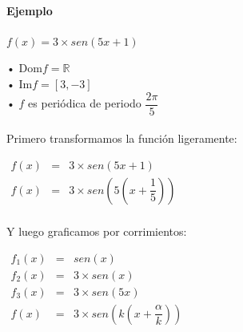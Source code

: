 \paragraph{Ejemplo}

\qquad $f(x)  = 3 \times sen(5x+1)$

\hfill
\begin{minipage}{.45\textwidth}
• Dom$f = \mathbb{R}$\\
• Im$f = [3, -3]$\\
• $f$ es periódica de periodo $\dfrac{2\pi}{5}$ \\
\\

Primero transformamos la función ligeramente:
\begin{center}
$\begin{array}{ccc}
f(x) & = & 3 \times sen(5x+1)\\
f(x) & = & 3 \times sen \left(5\left(x+\dfrac{1}{5}\right) \right)\\
\end{array}$\\
\end{center}

Y luego graficamos por corrimientos:


\begin{center}

$
\begin{array}{ccc}

f_1(x) & = & sen(x)\\
f_2(x) & = &3 \times sen(x)\\
f_3(x) & = &3 \times sen(5x)\\
f(x) & = &3 \times sen\left(k\left(x+\dfrac{\alpha}{k}\right) \right)
\end{array}$\\
\end{center}


\end{minipage}
\hfill
